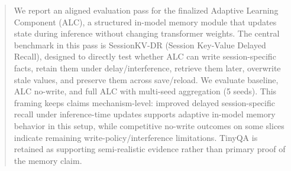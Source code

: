\begin{abstract}
We report an aligned evaluation pass for the finalized Adaptive Learning Component (ALC), a structured in-model memory module that updates state during inference without changing transformer weights. The central benchmark in this pass is SessionKV-DR (Session Key-Value Delayed Recall), designed to directly test whether ALC can write session-specific facts, retain them under delay/interference, retrieve them later, overwrite stale values, and preserve them across save/reload. We evaluate baseline, ALC no-write, and full ALC with multi-seed aggregation (5 seeds). This framing keeps claims mechanism-level: improved delayed session-specific recall under inference-time updates supports adaptive in-model memory behavior in this setup, while competitive no-write outcomes on some slices indicate remaining write-policy/interference limitations. TinyQA is retained as supporting semi-realistic evidence rather than primary proof of the memory claim.
\end{abstract}
